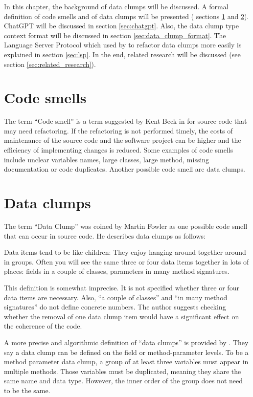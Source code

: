 In this chapter, the background of data clumps will be discussed. A formal definition of code smells and  of data clumps will be presented ( sections \ref{sec:code_smell} and \ref{sec:data_clump_def}). ChatGPT will be discussed in section \ref{sec:chatgpt}. Also, the data clump type context format will be discussed in section \ref{sec:data_clump_format}. The Language Server Protocol which used by to refactor data clumps more easily is explained in section \ref{sec:lsp}. In the end, related research will be discussed (see section \ref{sec:related_research}). 
\section{Code smells}\label{sec:code_smell}

The term \enquote{Code smell} is a term suggested by Kent Beck in \cite{fowler2019refactoring} for source code that may need refactoring. If the refactoring is not performed timely, the costs of maintenance of the source code and the software project can be higher and the efficiency of implementing changes is reduced. Some examples of code smells include unclear variables names, large classes, large method, missing documentation or code duplicates. Another possible code smell are data clumps. 

\section{Data clumps}\label{sec:data_clump_def}
The term \enquote{Data Clump} was coined by Martin Fowler as one possible code smell that can occur in source code. He describes data clumps as follows:

\begin{displayquote}
Data items tend to be like children: They enjoy hanging around together around in groups. Often you will see
the same three or four data items together in lots of
places: fields in a couple of classes, parameters in many
method signatures. \cite{fowler2019refactoring} 
\end{displayquote}

This definition is somewhat imprecise. It is not specified whether three or four data items are necessary. Also, \enquote{a couple of classes} and \enquote{in many method signatures} do not define concrete numbers. The author suggests checking whether the removal of one data clump item would have a significant effect on the coherence of the code.

A more precise and algorithmic definition of \enquote{data clumps} is provided by \cite{zhangImprovingPrecisionFowler2008}. They say a data clump  can be defined on the field or method-parameter levels. 
To be a method parameter data clump, a group of at least three variables must appear in multiple methods. Those variables must be duplicated, meaning they share the same name and data type. However, the inner order of the group does not need to be the same. 

